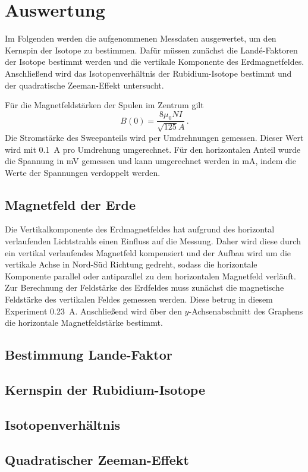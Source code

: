 \section{Auswertung}
\label{sec:auswertung}

Im Folgenden werden die aufgenommenen Messdaten ausgewertet, um den Kernspin der Isotope zu bestimmen.
Dafür müssen zunächst die Landé-Faktoren der Isotope bestimmt werden und die vertikale Komponente des Erdmagnetfeldes.
Anschließend wird das Isotopenverhältnis der Rubidium-Isotope bestimmt und der quadratische Zeeman-Effekt untersucht.

Für die Magnetfeldstärken der Spulen im Zentrum gilt
\begin{equation}
    B(0) = \frac{8  \mu_0  N I}{\sqrt{125} A}  \, .
\end{equation}
Die Stromstärke des Sweepanteils wird per Umdrehnungen gemessen.
Dieser Wert wird mit \qty{0.1}{\ampere} pro Umdrehung umgerechnet.
Für den horizontalen Anteil wurde die Spannung in \unit{\milli\volt} gemessen und kann umgerechnet werden in \unit{\milli\ampere},
indem die Werte der Spannungen verdoppelt werden.

\subsection{Magnetfeld der Erde}
\label{sec:magnetfeld-der-erde}

Die Vertikalkomponente des Erdmagnetfeldes hat aufgrund des horizontal verlaufenden Lichtstrahls einen Einfluss auf die Messung.
Daher wird diese durch ein vertikal verlaufendes Magnetfeld kompensiert und der Aufbau wird um die vertikale Achse in Nord-Süd Richtung gedreht,
sodass die horizontale Komponente parallel oder antiparallel zu dem horizontalen Magnetfeld verläuft.
Zur Berechnung der Feldstärke des Erdfeldes muss zunächst die magnetische Feldstärke des vertikalen Feldes gemessen werden.
Diese betrug in diesem Experiment \qty{0.23}{\ampere}.
Anschließend wird über den $y$-Achsenabschnitt des Graphens die horizontale Magnetfeldstärke bestimmt.



\subsection{Bestimmung Lande-Faktor}
\label{sec:best-lande-faktoren}




\subsection{Kernspin der Rubidium-Isotope}
\label{sec:Kernspin der Rubidium-Isotope}

\subsection{Isotopenverhältnis}
\label{sec:Isotopenverhältnis}

\subsection{Quadratischer Zeeman-Effekt}
\label{sec:quadratischer-zeeman-effekt}